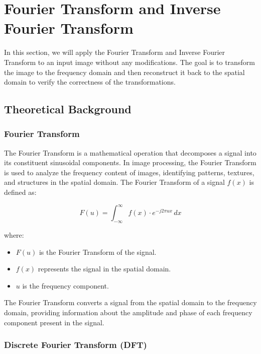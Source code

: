 \documentclass[a4paper,12pt]{article}
\begin{document}
\newpage

\section{Fourier Transform and Inverse Fourier Transform}

In this section, we will apply the Fourier Transform and Inverse Fourier Transform to an input image without any modifications. The goal is to transform the image to the frequency domain and then reconstruct it back to the spatial domain to verify the correctness of the transformations.

\subsection{Theoretical Background}

\subsubsection{Fourier Transform}

The Fourier Transform is a mathematical operation that decomposes a signal into its constituent sinusoidal components. In image processing, the Fourier Transform is used to analyze the frequency content of images, identifying patterns, textures, and structures in the spatial domain. The Fourier Transform of a signal \( f(x) \) is defined as:

\begin{equation}
    F(u) = \int_{-\infty}^{\infty} f(x) \cdot e^{-j 2 \pi u x} \, dx
\end{equation}

where:

\begin{itemize}
    \item \( F(u) \) is the Fourier Transform of the signal.
    \item \( f(x) \) represents the signal in the spatial domain.
    \item \( u \) is the frequency component.
\end{itemize}

The Fourier Transform converts a signal from the spatial domain to the frequency domain, providing information about the amplitude and phase of each frequency component present in the signal.

\subsubsection{Discrete Fourier Transform (DFT)}
\end{document}

